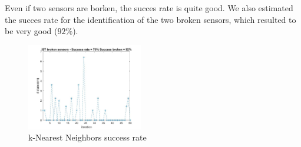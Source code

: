 Even if two sensors are borken, the succes rate is quite good. We also estimated the succes rate 
for the identification of the two broken sensors, which resulted to be very good ($92\%$).

\begin{figure}[H]
    \centering
    \includegraphics[width=0.45\textwidth]{img/extension_4-2.jpg}
    \caption{k-Nearest Neighbors success rate}
\end{figure}